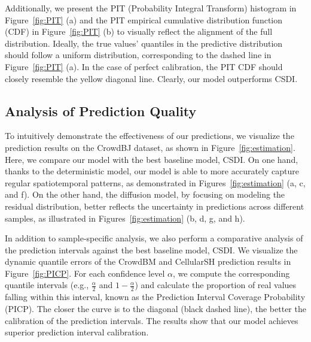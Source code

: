 Additionally, we present the PIT (Probability Integral Transform) histogram in Figure~\ref{fig:PIT} (a) and the PIT empirical cumulative distribution function (CDF) in Figure~\ref{fig:PIT} (b) to visually reflect the alignment of the full distribution. Ideally, the true values' quantiles in the predictive distribution should follow a uniform distribution, corresponding to the dashed line in Figure~\ref{fig:PIT} (a). In the case of perfect calibration, the PIT CDF should closely resemble the yellow diagonal line. Clearly, our model outperforms CSDI.


\subsection{Analysis of Prediction Quality}

To intuitively demonstrate the effectiveness of our predictions, we visualize the prediction results on the CrowdBJ dataset, as shown in Figure~\ref{fig:estimation}. Here, we compare our model with the best baseline model, CSDI. On one hand, thanks to the deterministic model, our model is able to more accurately capture regular spatiotemporal patterns, as demonstrated in Figures~\ref{fig:estimation} (a, c, and f). On the other hand, the diffusion model, by focusing on modeling the residual distribution, better reflects the uncertainty in predictions across different samples, as illustrated in Figures~\ref{fig:estimation} (b, d, g, and h).

In addition to sample-specific analysis, we also perform a comparative analysis of the prediction intervals against the best baseline model, CSDI. We visualize the dynamic quantile errors of the CrowdBM and CellularSH prediction results in Figure~\ref{fig:PICP}. For each confidence level $\alpha$, we compute the corresponding quantile intervals (e.g., $\frac{\alpha}{2}$ and $1-\frac{\alpha}{2}$) and calculate the proportion of real values falling within this interval, known as the Prediction Interval Coverage Probability (PICP). The closer the curve is to the diagonal (black dashed line), the better the calibration of the prediction intervals. The results show that our model achieves superior prediction interval calibration.